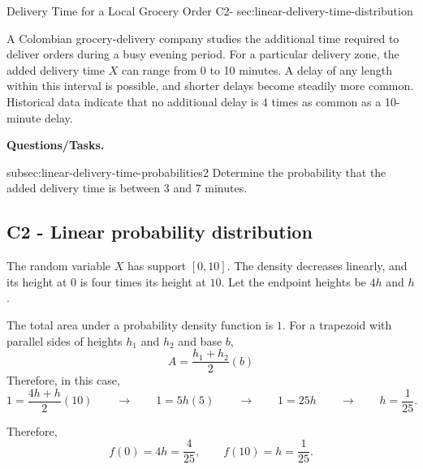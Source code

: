 	\sectionScored
	{Delivery Time for a Local Grocery Order}
	{C2-}
	{sec:linear-delivery-time-distribution}
	{
		A Colombian grocery-delivery company studies the additional time
		required to deliver orders during a busy evening period. For a particular
		delivery zone, the added delivery time \(X\) can range from 0 to
		10 minutes. A delay of any length within this interval is possible, and
		shorter delays become steadily more common. Historical data indicate
		that no additional delay is 4 times as common as a 10-minute delay.
		
		\textbf{Questions/Tasks.}
		\begin{enumerate}
			\CriterionTask
			{subsec:linear-delivery-time-probabilities}{2}
			{Determine the probability that the added delivery time is between 3 and 7 minutes. }
		\end{enumerate}
		
		\label{subsec:linear-delivery-time-probabilities}
		\subsection*{C2 - Linear probability distribution }
		
		The random variable \(X\) has support \([0,10]\). The density decreases
		linearly, and its height at \(0\) is four times its height at \(10\).
		Let the endpoint heights be \(4h\) and \(h\).
		
		
		The total area under a probability density function is \(1\).
		For a trapezoid with parallel sides of heights \(h_1\) and \(h_2\) and base \(b\),
		\[
		A=\frac{h_1+h_2}{2} (b)
		\]
		Therefore, in this case,
		\[
		1=\frac{4h+h}{2}(10)
		\qquad \rightarrow \qquad
		1=5h(5)
		\qquad \rightarrow \qquad
		1=25h
		\qquad \rightarrow \qquad
		h=\frac1{25}.
		\]
		
		Therefore,
		\[
		f(0)= 4h = \frac4{25},
		\qquad
		f(10)= h = \frac1{25}.
		\]
		
		
}
